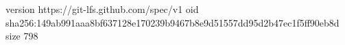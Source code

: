 version https://git-lfs.github.com/spec/v1
oid sha256:149ab991aaa8bf637128e170239b9467b8e9d51557dd95d2b47ec1f5ff90eb8d
size 798
